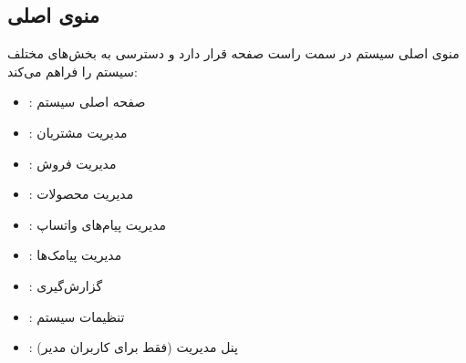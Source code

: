 \documentclass[letterpaper,10pt,english]{sphinxmanual}
\begin{document}
\subsection{منوی اصلی}
\label{\detokenize{user_guide/index:id5}}
\sphinxAtStartPar
منوی اصلی سیستم در سمت راست صفحه قرار دارد و دسترسی به بخش‌های مختلف سیستم را فراهم می‌کند:
\begin{itemize}
\item {} 
\sphinxAtStartPar
{}: صفحه اصلی سیستم

\item {} 
\sphinxAtStartPar
{}: مدیریت مشتریان

\item {} 
\sphinxAtStartPar
{}: مدیریت فروش

\item {} 
\sphinxAtStartPar
{}: مدیریت محصولات

\item {} 
\sphinxAtStartPar
{}: مدیریت پیام‌های واتساپ

\item {} 
\sphinxAtStartPar
{}: مدیریت پیامک‌ها

\item {} 
\sphinxAtStartPar
{}: گزارش‌گیری

\item {} 
\sphinxAtStartPar
{}: تنظیمات سیستم

\item {} 
\sphinxAtStartPar
{}: پنل مدیریت (فقط برای کاربران مدیر)

\end{itemize}
\end{document}
